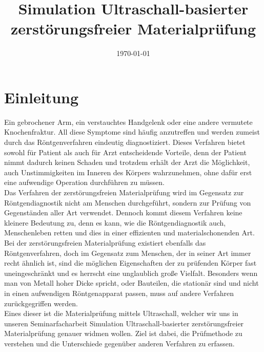 \documentclass[reducespace,stylepage,semiarbeit]{spezidoc}
\title{Simulation Ultraschall-basierter zerstörungsfreier Materialprüfung}
\date{\today}
\begin{document}
\maketitlepage
\newpage


\tableofcontents
\thispagestyle{empty}
\newpage

\setcounter{page}{1}

\section{Einleitung}
Ein gebrochener Arm, ein verstauchtes Handgelenk oder eine andere vermutete Knochenfraktur. All diese Symptome sind häufig anzutreffen und werden zumeist durch das Röntgenverfahren eindeutig diagnostiziert. Dieses Verfahren bietet sowohl für Patient als auch für Arzt entscheidende Vorteile, denn der Patient nimmt dadurch keinen Schaden und trotzdem erhält der Arzt die Möglichkeit, auch Unstimmigkeiten im Inneren des Körpers wahrzunehmen, ohne dafür erst eine aufwendige Operation durchführen zu müssen.\\
Das Verfahren der zerstörungsfreien Materialprüfung wird im Gegensatz zur Röntgendiagnostik nicht am Menschen durchgeführt, sondern zur Prüfung von Gegenständen aller Art verwendet. Dennoch kommt diesem Verfahren keine kleinere Bedeutung zu, denn es kann, wie die Röntgendiagnostik auch, Menschenleben retten und dies in einer effizienten und materialschonenden Art.\\
Bei der zerstörungsfreien Materialprüfung existiert ebenfalls das Röntgenverfahren, doch im Gegensatz zum Menschen, der in seiner Art immer recht ähnlich ist, sind die möglichen Eigenschaften der zu prüfenden Körper fast uneingeschränkt und es herrscht eine unglaublich große Vielfalt. Besonders wenn man von Metall hoher Dicke spricht, oder Bauteilen, die stationär sind und nicht in einen aufwendigen Röntgenapparat passen, muss auf andere Verfahren zurückgegriffen werden.\\
Eines dieser ist die Materialprüfung mittels Ultraschall, welcher wir uns in unseren Seminarfacharbeit \glqq Simulation Ultraschall-basierter zerstörungsfreier Materialprüfung\grqq{} genauer widmen wollen. Ziel ist dabei, die Prüfmethode zu verstehen und die Unterschiede gegenüber anderen Verfahren zu erfassen.\\
\end{document}
